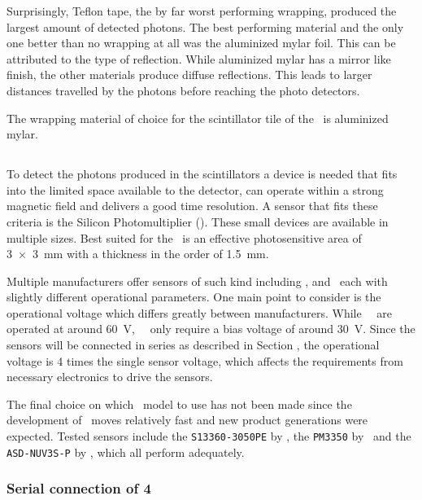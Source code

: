 \documentclass[../BTOF_summary.tex]{subfiles}
\begin{document}
Surprisingly, Teflon tape, the by far worst performing wrapping, produced the largest amount of detected photons.
The best performing material and the only one better than no wrapping at all was the aluminized mylar foil.
This can be attributed to the type of reflection.
While aluminized mylar has a mirror like finish, the other materials produce diffuse reflections.
This leads to larger distances travelled by the photons before reaching the photo detectors.

The wrapping material of choice for the scintillator tile of the \btofD\ is aluminized mylar.


\subsection{\sipm}

To detect the photons produced in the scintillators a device is needed that fits into the limited space available to the detector, can operate within a strong magnetic field and delivers a good time resolution.
A sensor that fits these criteria is the Silicon Photomultiplier (\sipm ).
These small devices are available in multiple sizes.
Best suited for the \btofD\ is an effective photosensitive area of \SI{3x3}{mm} with a thickness in the order of \SI{1.5}{mm}.

Multiple manufacturers offer sensors of such kind including \hamamatsu, \ketek and \advansid\ each with slightly different operational parameters.
One main point to consider is the operational voltage which differs greatly between manufacturers.
While \hamamatsu\ \sipms\ are operated at around \SI{60}{V}, \ketek\ \sipms\ only require a bias voltage of around \SI{30}{V}.
Since the sensors will be connected in series as described in Section , the operational voltage is 4 times the single sensor voltage, which affects the requirements from necessary electronics to drive the sensors.

The final choice on which \sipm\ model to use has not been made since the development of \sipms\ moves relatively fast and new product generations were expected.
Tested sensors include the \texttt{S13360-3050PE} by \hamamatsu, the \texttt{PM3350} by \ketek\ and the \texttt{ASD-NUV3S-P} by \advansid , which all perform adequately.

\subsubsection*{Serial connection of 4 \sipms}
\end{document}
